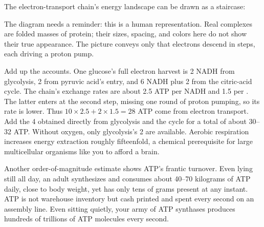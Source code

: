 The electron-transport chain's energy landscape can be drawn as a staircase:

\begin{center}
\end{center}

The diagram needs a reminder: this is a human representation. Real complexes are folded masses of protein; their sizes, spacing, and colors here do not show their true appearance. The picture conveys only that electrons descend in steps, each driving a proton pump.

\begin{qiaoliang}
Add up the accounts. One glucose's full electron harvest is 2 NADH from glycolysis, 2 from pyruvic acid's entry, and 6 NADH plus 2  from the citric-acid cycle. The chain's exchange rates are about 2.5 ATP per NADH and 1.5 per . The latter enters at the second step, missing one round of proton pumping, so its rate is lower. Thus $10\times 2.5 + 2\times 1.5 = 28$ ATP come from electron transport. Add the 4 obtained directly from glycolysis and the cycle for a total of about 30--32 ATP. Without oxygen, only glycolysis's 2 are available. Aerobic respiration increases energy extraction roughly fifteenfold, a chemical prerequisite for large multicellular organisms like you to afford a brain.

Another order-of-magnitude estimate shows ATP's frantic turnover. Even lying still all day, an adult synthesizes and consumes about 40--70 kilograms of ATP daily, close to body weight, yet has only tens of grams present at any instant. ATP is not warehouse inventory but cash printed and spent every second on an assembly line. Even sitting quietly, your army of ATP synthases produces hundreds of trillions of ATP molecules every second.
\end{qiaoliang}

